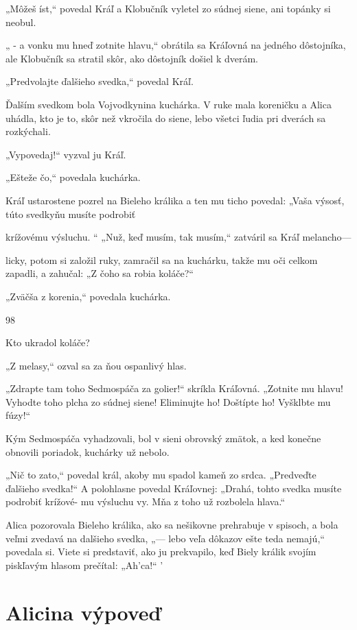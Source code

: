 \documentclass[12pt]{article}
\begin{document}
\begin{Parallel}[p]{}{}
{{„Môžeš íst,“ povedal Kráľ a Klobučník vyletel zo súdnej
siene, ani topánky si neobul.

„ - a vonku mu hneď zotnite hlavu,“ obrátila sa Kráľovná
na jedného dôstojníka, ale Klobučník sa stratil skôr, ako
dôstojník došiel k dverám.

„Predvolajte ďalšieho svedka,“ povedal Kráľ.

Ďalším svedkom bola Vojvodkynina kuchárka. V ruke
mala koreničku a Alica uhádla, kto je to, skôr než vkročila
do siene, lebo všetci ľudia pri dverách sa rozkýchali.

„Vypovedaj!“ vyzval ju Kráľ.

„Ešteže čo,“ povedala kuchárka.

Kráľ ustarostene pozrel na Bieleho králika a ten mu ticho
povedal: „Vaša výsosť, túto svedkyňu musíte podrobiť

krížovému výsluchu. “
„Nuž, keď musím, tak musím,“ zatváril sa Kráľ melancho—

licky, potom si založil ruky, zamračil sa na kuchárku, takže
mu oči celkom zapadli, a zahučal: „Z čoho sa robia
koláče?“

„Zväčša z korenia,“ povedala kuchárka.

98

Kto ukradol koláče?

„Z melasy,“ ozval sa za ňou ospanlivý hlas.

„Zdrapte tam toho Sedmospáča za golier!“ skríkla
Kráľovná. „Zotnite mu hlavu! Vyhodte toho plcha zo
súdnej siene! Eliminujte ho! Doštípte ho! Vyšklbte mu
fúzy!“

Kým Sedmospáča vyhadzovali, bol v sieni obrovský
zmätok, a ked konečne obnovili poriadok, kuchárky už
nebolo.

„Nič to zato,“ povedal král, akoby mu spadol kameň zo
srdca. „Predveďte ďalšieho svedka!“ A polohlasne povedal
Kráľovnej: „Drahá, tohto svedka musíte podrobiť krížové-
mu výsluchu vy. Mňa z toho už rozbolela hlava.“

Alica pozorovala Bieleho králika, ako sa nešikovne
prehrabuje v spisoch, a bola veľmi zvedavá na dalšieho
svedka, „— lebo veľa dôkazov ešte teda nemajú,“ povedala
si. Viete si predstaviť, ako ju prekvapilo, keď Biely králik
svojím piskľavým hlasom prečítal: „Ah'ca!“ '

\section{Alicina výpoveď}

}}
\end{Parallel}
\end{document}
